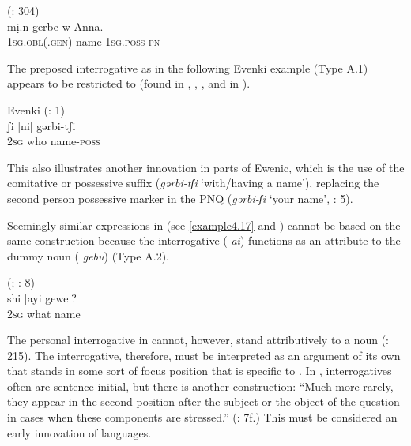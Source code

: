 \documentclass[output=paper,colorlinks,citecolor=brown]{langscibook}
\begin{document}
\ea
    \label{example4.130}
     (\citealt{Doerferetal1980}: 304)\\
    \gll mị.n			gerbe-w			Anna.\\
    1\textsc{sg.obl}(.\textsc{gen})		name-1\textsc{sg.poss}		\textsc{pn}\\
    \z

\noindent The preposed interrogative as in the following  Evenki example (Type A.1) appears to be restricted to  (found in , , , and  in ).

\ea
    \label{example4.131}
     Evenki (\citealt{ChaokeSirenbatu2016H}: 1)\\
    \gll ʃi		[ni]		gərbi-tʃi\\
    2\textsc{sg}		who		name-\textsc{poss}\\
    \z

\noindent This also illustrates another innovation in parts of Ewenic, which is the use of the comitative or possessive suffix (\textit{gərbi-tʃi} `with/having a name'), replacing the second person possessive marker in the PNQ (\textit{gərbi-ʃi} `your name', \citealt{ChaokeSirenbatu2016H}: 5).

Seemingly similar expressions in  (see \ref{example4.17} and ) cannot be based on the same construction because the interrogative ( \textit{ai}) functions as an attribute to the dummy noun ( \textit{gebu}) (Type A.2).

\ea
    \label{example4.132}
     (; \citealt{Chaoke2014c}: 8)\\
    \gll shi		[ayi		gewe]?\\
    2\textsc{sg}		what		name\\
    \z

\noindent The personal interrogative in  cannot, however, stand attributively to a noun (\citealt{Nedjalkov1997}: 215). The interrogative, therefore, must be interpreted as an argument of its own that stands in some sort of focus position that is specific to . In , interrogatives often are sentence-initial, but there is another construction: “Much more rarely, they appear in the second position after the subject or the object of the question in cases when these components are stressed.” (\citealt{Nedjalkov1997}: 7f.) This must be considered an early innovation of  languages.
\end{document}
